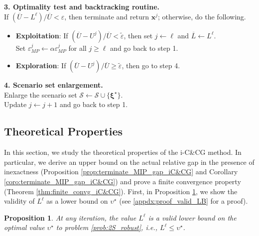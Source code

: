\documentclass[preprint,review,11pt]{elsarticle}
\newtheorem{prop}[thm]{Proposition}
\theoremstyle{definition}
\theoremstyle{remark}
\newcommand{\epst}{\widetilde{\varepsilon}}
\newcommand{\calS}{\mathcal{S}}
\newcommand{\xb}{\pmb{x}}
\newcommand{\xib}{\pmb{\xi}}
\newcommand{\Lbar}{\overline{L}}
\newcommand{\Ubar}{\overline{U}}
\begin{document}
\begin{algorithm}[t]
\textbf{3. Optimality test and backtracking routine.} \\
\hspace{5.3mm}If $(\Ubar-L^\ell)/\Ubar<\varepsilon$, then terminate and return $\xb^j$; otherwise, do the following.
%
\begin{itemize}
    \item \textbf{Exploitation}: If $(\Ubar-U^j)/\Ubar < \epst$, then set $j\leftarrow \ell$ and $\Lbar\leftarrow L^\ell$. \\ Set $\varepsilon^j_{MP}\leftarrow \alpha \varepsilon^j_{MP}$ for all $j\geq \ell$ and go back to step 1. \vspace{-3mm}
    \item \textbf{Exploration}: If $(\Ubar-U^j)/\Ubar  \geq \epst$, then go to step 4.  \vspace{-3mm}
\end{itemize}
%
\textbf{4. Scenario set enlargement.}\\
\hspace{5.3mm}Enlarge the scenario set $\calS \leftarrow \calS\cup\{\xib^\star\}$. \\ \hspace{4.0mm} Update $j \leftarrow j+1$ and go back to step 1.
\BlankLine
\caption{Inexact column-and-constraint (i-C\&CG) method} \label{algo:inexact_C&CG}
\end{algorithm}\DecMargin{1em}


\subsection{Theoretical Properties}  \label{subsec:inexact_C&CG_theory}

In this section, we study the theoretical properties of the i-C\&CG method. In particular, we derive an upper bound on the actual relative gap in the presence of inexactness (Proposition \ref{prop:terminate_MIP_gap_iC&CG} and Corollary \ref{coro:terminate_MIP_gap_iC&CG}) and prove a finite convergence property (Theorem \ref{thm:finite_convg_iC&CG}). First, in Proposition \ref{prop:valid_LB_iC&CG}, we show the validity of $L^\ell$ as a lower bound on $\upsilon^\star$ (see \ref{appdx:proof_valid_LB} for a proof).


\begin{prop}  \label{prop:valid_LB_iC&CG}
At any iteration, the value $L^\ell$ is a valid lower bound on the optimal value $\upsilon^\star$ to problem \eqref{prob:2S_robust}, i.e., $L^\ell \leq \upsilon^\star$.
\end{prop}
\end{document}
